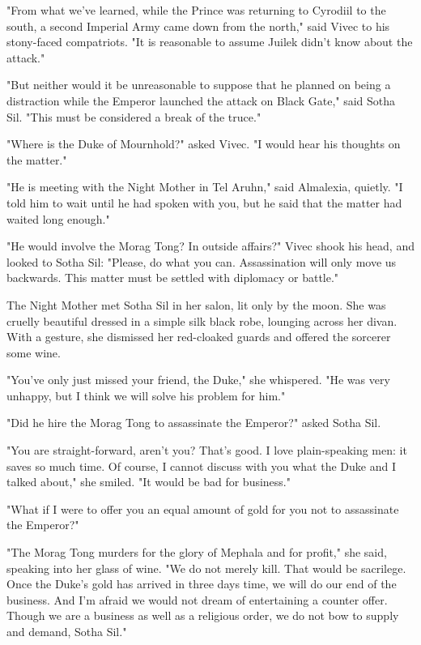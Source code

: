 "From what we've learned, while the Prince was returning to Cyrodiil to the south, a second Imperial Army came down from the north," said Vivec to his stony-faced compatriots. "It is reasonable to assume Juilek didn't know about the attack."

"But neither would it be unreasonable to suppose that he planned on being a distraction while the Emperor launched the attack on Black Gate," said Sotha Sil. "This must be considered a break of the truce."

"Where is the Duke of Mournhold?" asked Vivec. "I would hear his thoughts on the matter."

"He is meeting with the Night Mother in Tel Aruhn," said Almalexia, quietly. "I told him to wait until he had spoken with you, but he said that the matter had waited long enough."

"He would involve the Morag Tong? In outside affairs?" Vivec shook his head, and looked to Sotha Sil: "Please, do what you can. Assassination will only move us backwards. This matter must be settled with diplomacy or battle."

The Night Mother met Sotha Sil in her salon, lit only by the moon. She was cruelly beautiful dressed in a simple silk black robe, lounging across her divan. With a gesture, she dismissed her red-cloaked guards and offered the sorcerer some wine.

"You've only just missed your friend, the Duke," she whispered. "He was very unhappy, but I think we will solve his problem for him."

"Did he hire the Morag Tong to assassinate the Emperor?" asked Sotha Sil.

"You are straight-forward, aren't you? That's good. I love plain-speaking men: it saves so much time. Of course, I cannot discuss with you what the Duke and I talked about," she smiled. "It would be bad for business."

"What if I were to offer you an equal amount of gold for you not to assassinate the Emperor?"

"The Morag Tong murders for the glory of Mephala and for profit," she said, speaking into her glass of wine. "We do not merely kill. That would be sacrilege. Once the Duke's gold has arrived in three days time, we will do our end of the business. And I'm afraid we would not dream of entertaining a counter offer. Though we are a business as well as a religious order, we do not bow to supply and demand, Sotha Sil."

